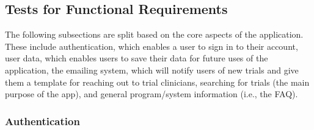 \documentclass[12pt, titlepage]{article}
\begin{document}
\subsection{Tests for Functional Requirements}

The following subsections are split based on the core aspects of the application. These include authentication, which enables a user 
to sign in to their account, user data, which enables users to save their data for future uses of the application, the emailing system, which will
notify users of new trials and give them a template for reaching out to trial clinicians, searching for trials (the main purpose of the app), and 
general program/system information (i.e., the FAQ).

\subsubsection{Authentication}
\end{document}

